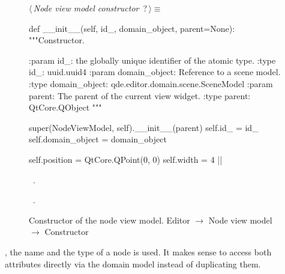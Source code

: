 \documentclass[%
    a4paper,    %
    justified,  %
    nobib,      %
    openany     %
]{tufte-book}
\begin{document}
\begin{figure}
\begin{flushleft} \small
\begin{minipage}{\linewidth}\label{scrap69}\raggedright\small
{} $\langle\,${\itshape Node view model constructor}\nobreak\ {\footnotesize {?}}$\,\rangle\equiv$
\vspace{-1ex}
\begin{pythoncode}
def __init__(self, id_, domain_object, parent=None):
    """Constructor.

    :param id_: the globally unique identifier of the atomic type.
    :type  id_: uuid.uuid4
    :param domain_object: Reference to a scene model.
    :type  domain_object: qde.editor.domain.scene.SceneModel
    :param parent: The parent of the current view widget.
    :type parent:  QtCore.QObject
    """

    super(NodeViewModel, self).__init__(parent)
    self.id_ = id_
    self.domain_object = domain_object

    self.position = QtCore.QPoint(0, 0)
    self.width = 4
|\NWsep|
\end{pythoncode}
\vspace{1.5ex}
\footnotesize
\begin{list}{}{\setlength{\itemsep}{-\parsep}\setlength{\itemindent}{-\leftmargin}}
\item \NWtxtMacroDefBy\ .
\item \NWtxtMacroRefIn\ .

\item{}
\end{list}
\end{minipage}\vspace{4ex}
\end{flushleft}
\caption{Constructor of the node view model.
  \newline{}\newline{}Editor $\rightarrow$ Node view model $\rightarrow$
  Constructor}
\label{editor:lst:node-view-model:constructor}
\end{figure}

, the name and the type of a node is used. It
makes sense to access both attributes directly via the domain model instead of
duplicating them.
\end{document}
